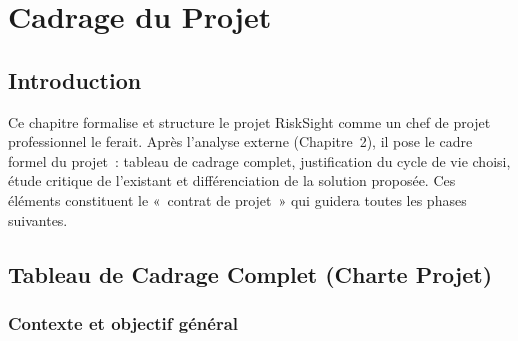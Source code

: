 \documentclass[12pt, a4paper]{report}
\begin{document}
\chapter{Cadrage du Projet}
\vspace{1cm}
\section{Introduction}

Ce chapitre formalise et structure le projet RiskSight comme un chef de projet
professionnel le ferait. Après l'analyse externe (Chapitre~2), il pose le cadre
formel du projet~: tableau de cadrage complet, justification du cycle de vie choisi,
étude critique de l'existant et différenciation de la solution proposée. Ces
éléments constituent le «~contrat de projet~» qui guidera toutes les phases
suivantes.
\vspace{1cm}

\section{Tableau de Cadrage Complet (Charte Projet)}

\subsection{Contexte et objectif général}
\end{document}
